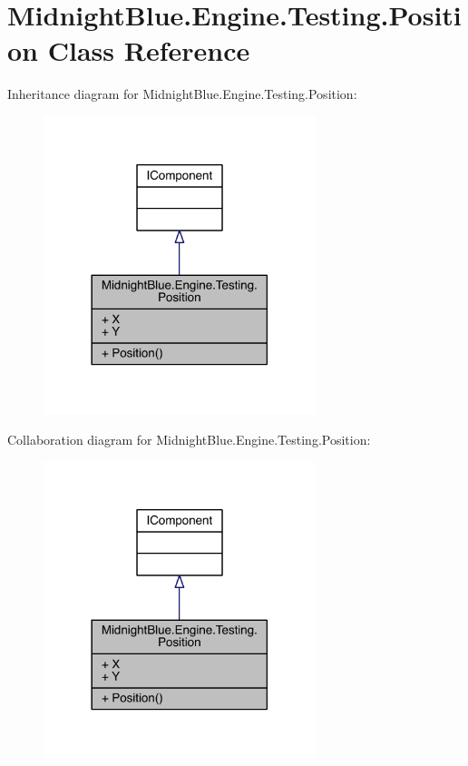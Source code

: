 \hypertarget{class_midnight_blue_1_1_engine_1_1_testing_1_1_position}{}\section{Midnight\+Blue.\+Engine.\+Testing.\+Position Class Reference}
\label{class_midnight_blue_1_1_engine_1_1_testing_1_1_position}


Inheritance diagram for Midnight\+Blue.\+Engine.\+Testing.\+Position\+:
\nopagebreak
\begin{figure}[H]
\begin{center}
\leavevmode
\includegraphics[width=225pt]{class_midnight_blue_1_1_engine_1_1_testing_1_1_position__inherit__graph}
\end{center}
\end{figure}


Collaboration diagram for Midnight\+Blue.\+Engine.\+Testing.\+Position\+:
\nopagebreak
\begin{figure}[H]
\begin{center}
\leavevmode
\includegraphics[width=225pt]{class_midnight_blue_1_1_engine_1_1_testing_1_1_position__coll__graph}
\end{center}
\end{figure}
